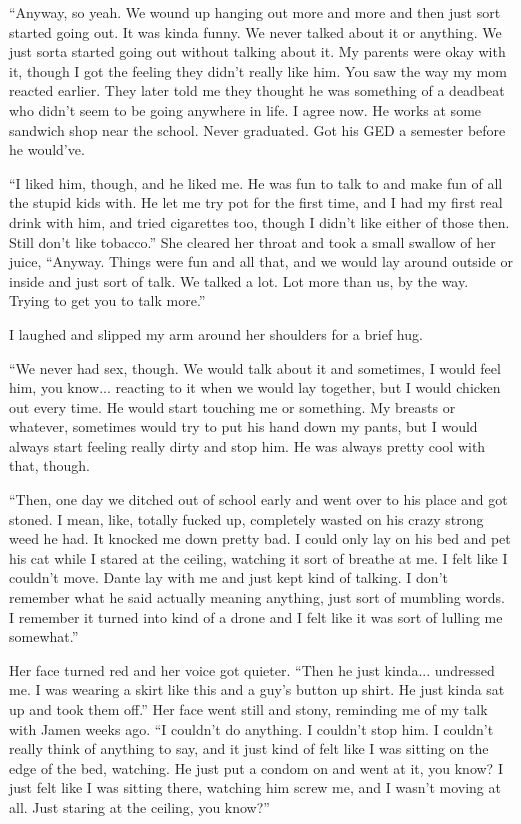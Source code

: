 ``Anyway, so yeah.  We wound up hanging out more and more and then just sort started going out.  It was kinda funny.  We never talked about it or anything.  We just sorta started going out without talking about it.  My parents were okay with it, though I got the feeling they didn't really like him.  You saw the way my mom reacted earlier.  They later told me they thought he was something of a deadbeat who didn't seem to be going anywhere in life.  I agree now.  He works at some sandwich shop near the school.  Never graduated.  Got his GED a semester before he would've.

``I liked him, though, and he liked me.  He was fun to talk to and make fun of all the stupid kids with.  He let me try pot for the first time, and I had my first real drink with him, and tried cigarettes too, though I didn't like either of those then.  Still don't like tobacco.''  She cleared her throat and took a small swallow of her juice, ``Anyway.  Things were fun and all that, and we would lay around outside or inside and just sort of talk.  We talked a lot.  Lot more than us, by the way.  Trying to get you to talk more.''

I laughed and slipped my arm around her shoulders for a brief hug.

``We never had sex, though.  We would talk about it and sometimes, I would feel him, you know... reacting to it when we would lay together, but I would chicken out every time.  He would start touching me or something.  My breasts or whatever, sometimes would try to put his hand down my pants, but I would always start feeling really dirty and stop him.  He was always pretty cool with that, though.

``Then, one day we ditched out of school early and went over to his place and got stoned.  I mean, like, totally fucked up, completely wasted on his crazy strong weed he had.  It knocked me down pretty bad.  I could only lay on his bed and pet his cat while I stared at the ceiling, watching it sort of breathe at me.  I felt like I couldn't move.  Dante lay with me and just kept kind of talking.  I don't remember what he said actually meaning anything, just sort of mumbling words.  I remember it turned into kind of a drone and I felt like it was sort of lulling me somewhat.''

Her face turned red and her voice got quieter.  ``Then he just kinda... undressed me.  I was wearing a skirt like this and a guy's button up shirt.  He just kinda sat up and took them off.''  Her face went still and stony, reminding me of my talk with Jamen weeks ago.  ``I couldn't do anything.  I couldn't stop him.  I couldn't really think of anything to say, and it just kind of felt like I was sitting on the edge of the bed, watching.  He just put a condom on and went at it, you know?  I just felt like I was sitting there, watching him screw me, and I wasn't moving at all.  Just staring at the ceiling, you know?''

